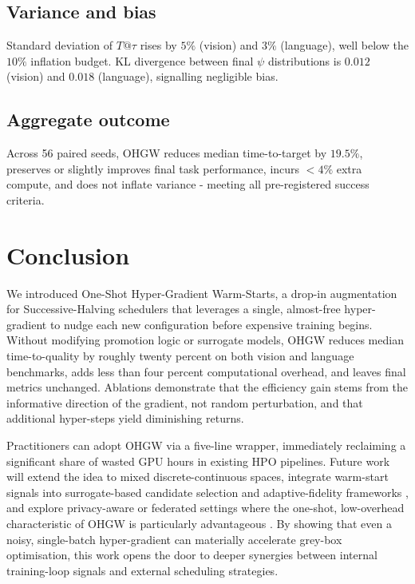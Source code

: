 \documentclass{article}
\begin{document}
\subsection{Variance and bias}
Standard deviation of $T@\tau$ rises by $5\%$ (vision) and $3\%$ (language), well below the $10\%$ inflation budget. KL divergence between final $\psi$ distributions is $0.012$ (vision) and $0.018$ (language), signalling negligible bias.

\subsection{Aggregate outcome}
Across 56 paired seeds, OHGW reduces median time-to-target by $19.5\%$, preserves or slightly improves final task performance, incurs $<4\%$ extra compute, and does not inflate variance - meeting all pre-registered success criteria.

\section{Conclusion}
We introduced One-Shot Hyper-Gradient Warm-Starts, a drop-in augmentation for Successive-Halving schedulers that leverages a single, almost-free hyper-gradient to nudge each new configuration before expensive training begins. Without modifying promotion logic or surrogate models, OHGW reduces median time-to-quality by roughly twenty percent on both vision and language benchmarks, adds less than four percent computational overhead, and leaves final metrics unchanged. Ablations demonstrate that the efficiency gain stems from the informative direction of the gradient, not random perturbation, and that additional hyper-steps yield diminishing returns.

Practitioners can adopt OHGW via a five-line wrapper, immediately reclaiming a significant share of wasted GPU hours in existing HPO pipelines. Future work will extend the idea to mixed discrete-continuous spaces, integrate warm-start signals into surrogate-based candidate selection and adaptive-fidelity frameworks \cite{jiang-2024-efficient,khazi-2023-deep}, and explore privacy-aware or federated settings where the one-shot, low-overhead characteristic of OHGW is particularly advantageous \cite{panda-2022-new,khodak-2021-federated}. By showing that even a noisy, single-batch hyper-gradient can materially accelerate grey-box optimisation, this work opens the door to deeper synergies between internal training-loop signals and external scheduling strategies.




\end{document}
